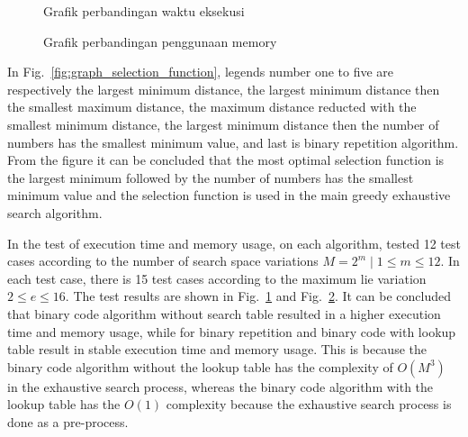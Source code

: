 \documentclass{TTP_DSL2006}
\begin{document}
\begin{figure}
	\centering
	\caption{Grafik perbandingan waktu eksekusi}
	\label{fig:graph_time}
\end{figure}

\begin{figure}
	\centering
	\caption{Grafik perbandingan penggunaan memory}
	\label{fig:graph_memory}
\end{figure}

In Fig.~\ref{fig:graph_selection_function}, legends number one to five are respectively the largest minimum distance, the largest minimum distance then the smallest maximum distance, the maximum distance reducted with the smallest minimum distance, the largest minimum distance then the number of numbers has the smallest minimum value, and last is binary repetition algorithm. From the figure it can be concluded that the most optimal selection function is the largest minimum followed by the number of numbers has the smallest minimum value and the selection function is used in the main greedy exhaustive search algorithm.

In the test of execution time and memory usage, on each algorithm, tested 12 test cases according to the number of search space variations $M = 2^m \mid 1 \leq m \leq 12$. In each test case, there is 15 test cases according to the maximum lie variation $2 \leq e \leq 16$. The test results are shown in Fig.~\ref{fig:graph_time} and Fig.~\ref{fig:graph_memory}. It can be concluded that binary code algorithm without search table resulted in a higher execution time and memory usage, while for binary repetition and binary code with lookup table result in stable execution time and memory usage. This is because the binary code algorithm without the lookup table has the complexity of $O(M^3) $ in the exhaustive search process, whereas the binary code algorithm with the lookup table has the $O(1)$ complexity because the exhaustive search process is done as a pre-process.
\end{document}
